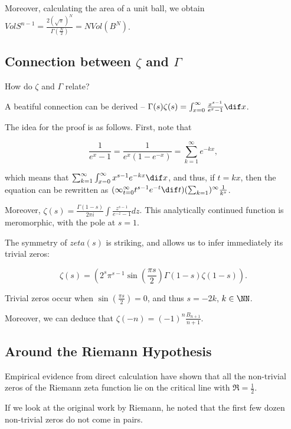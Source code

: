 \documentclass[11pt]{scrartcl}
\begin{document}
  Moreover, calculating the area of a unit ball, we obtain
  $Vol S^{n-1} = \frac{2(\sqrt{\pi})^{N}}{\Gamma(\frac{N}{2})} = N
  Vol(B^{N})$.

  \subsection{Connection between $\zeta$ and $\Gamma$}  

  How do $\zeta$ and $\Gamma$ relate?
  
  A beatiful connection can be derived --
  $\Gamma(s)\zeta(s) = \int_{x=0}^{\infty} \frac{x^{s-1}}{e^{x} - 1}
  \dif x$.

  The idea for the proof is as follows. First, note that

  \begin{equation}
    \frac{1}{e^{x}- 1} = \frac{1}{e^{x}(1-e^{-x})} = \sum_{k=1}^{\infty}e^{-kx},
  \end{equation}

  which means that
  $\sum_{k=1}^{\infty} \int_{x=0}^{\infty}x^{s-1}e^{-kx} \dif x$, and
  thus, if $t = kx$, then the equation can be rewritten as
  $(\infty_{t=0}^{\infty}t^{s-1}e^{-t}\dif
  t)(\sum_{k=1})^{\infty}\frac{1}{k^{s}}$.

  Moreover,
  $\zeta(s) = \frac{\Gamma(1-s)}{2\pi i}\int \frac{z^{s-1}}{e^{-z}-1}
  dz$. This analytically continued function is meromorphic, with the
  pole at $s = 1$.

  The symmetry of $zeta(s)$ is striking, and allows us to infer immediately its trivial zeros:

  \begin{equation}
    \zeta(s) = (2^{s}\pi^{s-1}\sin(\frac{\pi s}{2}) \Gamma(1-s) \zeta(1-s)).
  \end{equation}

  Trivial zeros occur when $\sin (\frac{\pi s}{2}) = 0$, and thus
  $s = -2k$, $k\in \NN$.

  Moreover, we can deduce that
  $\zeta(-n) = (-1)^{n} \frac{B_{n+1}}{n+1}$.

  \subsection{Around the Riemann Hypothesis}

  Empirical evidence from direct calculation have shown that all the
  non-trivial zeros of the Riemann zeta function lie on the critical
  line with $\Re = \frac{1}{2}$.

  If we look at the original work by Riemann, he noted that the first
  few dozen non-trivial zeros do not come in pairs.
\end{document}
